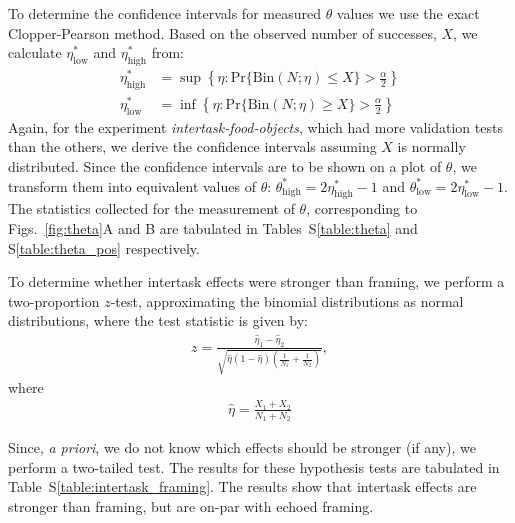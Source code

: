 \documentclass[12pt]{article}
\begin{document}
To determine the confidence intervals for measured $\theta$ values we 
use the exact Clopper-Pearson method. %
Based on the observed number of successes, $X$, we calculate 
$\eta^*_\mathrm{low}$ and $\eta^*_\mathrm{high}$ from:
\begin{align}
	\eta^*_\mathrm{high} &= \sup
		\left\{
			\eta : \mathrm{Pr}\{\mathrm{Bin}(N; \eta) \leq X \} > 
				\frac{\alpha}{2}
		\right\} \\
	\eta^*_\mathrm{low} &= \inf
		\left\{
			\eta : \mathrm{Pr}\{\mathrm{Bin}(N; \eta) \geq X \} > 
				\frac{\alpha}{2}
		\right\}
\end{align}
Again, for the experiment \textit{intertask-food-objects}, which had 
more validation tests than the others, we derive the confidence intervals
assuming $X$ is normally distributed.
Since the confidence intervals are to be shown on a plot of $\theta$, we 
transform them into equivalent values of 
$\theta$: $\theta^*_\mathrm{high} = 2\eta^*_\mathrm{high} - 1$ and 
$\theta^*_\mathrm{low} = 2\eta^*_\mathrm{low} - 1$.
The statistics collected for the measurement of $\theta$, corresponding to
Figs.~\ref{fig:theta}A and B are tabulated in Tables~S\ref{table:theta} and
S\ref{table:theta_pos} respectively.

To determine whether intertask effects were stronger than framing, we 
perform a two-proportion $z$-test, approximating the binomial distributions
as normal distributions, where the test statistic is given by:
\begin{align}
	z = \frac{\hat{\eta}_1 - \hat{\eta}_2}
		{\sqrt{
			\hat{\eta} (1 - \hat{\eta}) 
			\left( \frac{1}{N_1} + \frac{1}{N_2}\right)
		}},
\end{align}
where
\begin{align}
	\hat{\eta} = \frac{X_1 + X_2}{N_1 + N_2}
\end{align}


Since, \textit{a priori}, we do not know which effects
should be stronger (if any), we perform a two-tailed test.  The results for 
these hypothesis tests are tabulated in Table~S\ref{table:intertask_framing}.
The results show that intertask effects are stronger than framing, but are
on-par with echoed framing.
\end{document}
